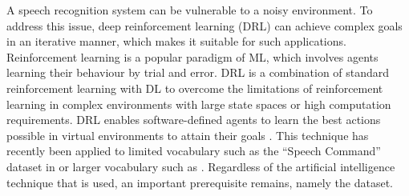 A speech recognition system can be vulnerable to a noisy environment. To address this issue, deep reinforcement learning (DRL) can achieve complex goals in an iterative manner, which makes it suitable for such applications. Reinforcement learning is a popular paradigm of ML, which involves agents learning their behaviour by trial and error. DRL is a combination of standard reinforcement learning with DL to overcome the limitations of reinforcement learning in complex environments with large state spaces or high computation requirements. DRL enables software-defined agents to learn the best actions possible in virtual environments to attain their goals . This technique has recently been applied to limited vocabulary such as the “Speech Command” dataset in  or larger vocabulary such as .
Regardless of the artificial intelligence technique that is used, an important prerequisite remains, namely the dataset.



